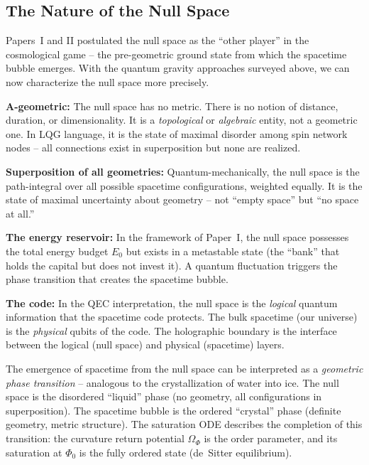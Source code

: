 \documentclass[aps,prd,twocolumn,superscriptaddress,nofootinbib]{revtex4-2}
\begin{document}
\subsection{The Nature of the Null Space}
\label{subsec:null_space}

Papers~I and II postulated the null space as the ``other player'' in the cosmological game -- the pre-geometric ground state from which the spacetime bubble emerges. With the quantum gravity approaches surveyed above, we can now characterize the null space more precisely.

\textbf{A-geometric:} The null space has no metric. There is no notion of distance, duration, or dimensionality. It is a \textit{topological} or \textit{algebraic} entity, not a geometric one. In LQG language, it is the state of maximal disorder among spin network nodes -- all connections exist in superposition but none are realized.

\textbf{Superposition of all geometries:} Quantum-mechanically, the null space is the path-integral \cite{Feynman1948} over all possible spacetime configurations, weighted equally. It is the state of maximal uncertainty about geometry -- not ``empty space'' but ``no space at all.''

\textbf{The energy reservoir:} In the framework of Paper~I, the null space possesses the total energy budget $E_0$ but exists in a metastable state (the ``bank'' that holds the capital but does not invest it). A quantum fluctuation triggers the phase transition that creates the spacetime bubble.

\textbf{The code:} In the QEC interpretation, the null space is the \textit{logical} quantum information that the spacetime code protects. The bulk spacetime (our universe) is the \textit{physical} qubits of the code. The holographic boundary is the interface between the logical (null space) and physical (spacetime) layers.

The emergence of spacetime from the null space can be interpreted as a \textit{geometric phase transition} -- analogous to the crystallization of water into ice. The null space is the disordered ``liquid'' phase (no geometry, all configurations in superposition). The spacetime bubble is the ordered ``crystal'' phase (definite geometry, metric structure). The saturation ODE describes the completion of this transition: the curvature return potential $\Omega_\Phi$ is the order parameter, and its saturation at $\Phi_0$ is the fully ordered state (de~Sitter equilibrium).
\end{document}
